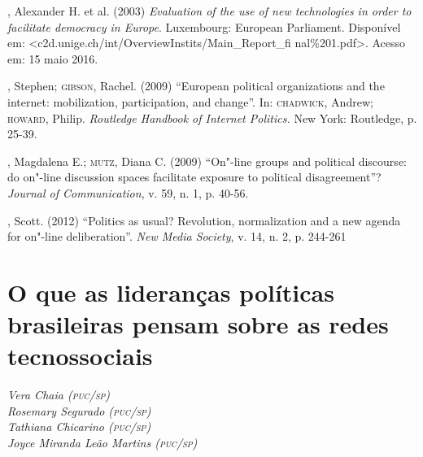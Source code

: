 \begin{bibliohedra}
, Alexander H. et al. (2003) \emph{Evaluation of the use of new
technologies in order to facilitate democracy in Europe}. Luxembourg:
European Parliament. Disponível em:
\textless{}c2d.unige.ch/int/OverviewInstits/Main\_Report\_fi
nal\%201.pdf\textgreater{}. Acesso em: 15 maio 2016.

, Stephen; \textsc{gibson}, Rachel. (2009) ``European political organizations
and the internet: mobilization, participation, and change''. In:
\textsc{chadwick}, Andrew; \textsc{howard}, Philip. \emph{Routledge Handbook of Internet
Politics.} New York: Routledge, p. 25-39.

, Magdalena E.; \textsc{mutz}, Diana C. (2009) ``On"-line groups and
political discourse: do on"-line discussion spaces facilitate exposure to
political disagreement''? \emph{Journal of Communication}, v. 59, n. 1,
p. 40-56.

, Scott. (2012) ``Politics as usual? Revolution, normalization and
a new agenda for on"-line deliberation''. \emph{New Media Society}, v.
14, n. 2, p. 244-261
\end{bibliohedra}

\chapter*{O que as lideranças políticas brasileiras pensam sobre as redes
tecnossociais}

\begin{flushright}
\emph{Vera Chaia (\textsc{puc}/\textsc{sp})\\Rosemary Segurado (\textsc{puc}/\textsc{sp})\\Tathiana
Chicarino (\textsc{puc}/\textsc{sp})\\Joyce Miranda Leão Martins (\textsc{puc}/\textsc{sp})}
\end{flushright}


